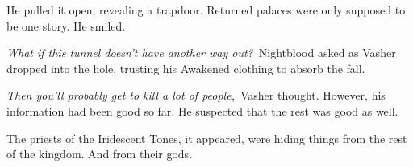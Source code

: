 He pulled it open, revealing a trapdoor. Returned palaces were only supposed to be one story. He smiled.

\textit{What if this tunnel doesn’t have another way out?}~Nightblood asked as Vasher dropped into the hole, trusting his Awakened clothing to absorb the fall.

\textit{Then you’ll probably get to kill a lot of people,}~Vasher thought. However, his information had been good so far. He suspected that the rest was good as well.

The priests of the Iridescent Tones, it appeared, were hiding things from the rest of the kingdom. And from their gods.


